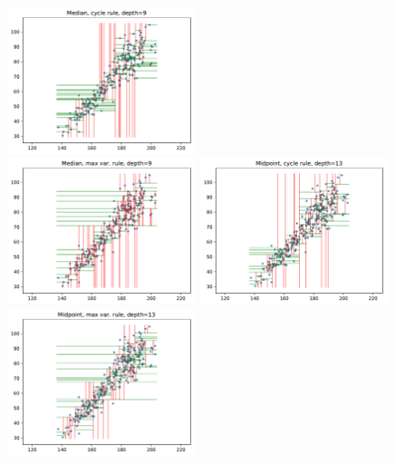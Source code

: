 \documentclass{beamer}
\begin{document}
\begin{frame}
	\begin{columns}[t]
		\centering
		\includegraphics[width=5.5cm]{graphics/median_cycle}\\
		\includegraphics[width=5.5cm]{graphics/median_maxvar}
		\centering
		\includegraphics[width=5.5cm]{graphics/midpoint_cycle}\\
		\includegraphics[width=5.5cm]{graphics/midpoint_maxvar}
	\end{columns}
\end{frame}
\end{document}
